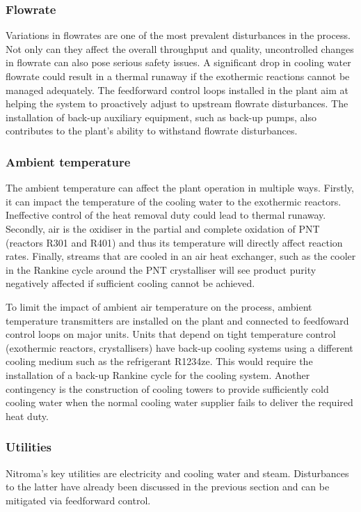 \subsubsection{Flowrate}
Variations in flowrates are one of the most prevalent disturbances in the process. Not only can they affect the overall throughput and quality, uncontrolled changes in flowrate can also pose serious safety issues. A significant drop in cooling water flowrate could result in a thermal runaway if the exothermic reactions cannot be managed adequately. The feedforward control loops installed in the plant aim at helping the system to proactively adjust to upstream flowrate disturbances. The installation of back-up auxiliary equipment, such as back-up pumps, also contributes to the plant's ability to withstand flowrate disturbances.

\subsubsection{Ambient temperature}
The ambient temperature can affect the plant operation in multiple ways. Firstly, it can impact the temperature of the cooling water to the exothermic reactors. Ineffective control of the heat removal duty could lead to thermal runaway. Secondly, air is the oxidiser in the partial and complete oxidation of PNT (reactors R301 and R401) and thus its temperature will directly affect reaction rates. Finally, streams that are cooled in an air heat exchanger, such as the cooler in the Rankine cycle around the PNT crystalliser will see product purity negatively affected if sufficient cooling cannot be achieved. 

To limit the impact of ambient air temperature on the process, ambient temperature transmitters are installed on the plant and connected to feedfoward control loops on major units. Units that depend on tight temperature control (exothermic reactors, crystallisers) have back-up cooling systems using a different cooling medium such as the refrigerant R1234ze. This would require the installation of a back-up Rankine cycle for the cooling system. Another contingency is the construction of cooling towers to provide sufficiently cold cooling water when the normal cooling water supplier fails to deliver the required heat duty.

\subsubsection{Utilities}
Nitroma's key utilities are electricity and cooling water and steam. Disturbances to the latter have already been discussed in the previous section and can be mitigated via feedforward control.

